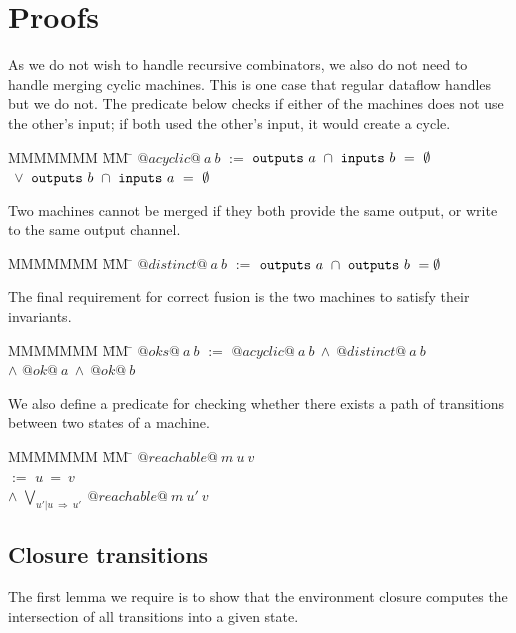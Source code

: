 \section{Proofs}
\label{s:Proofs}

As we do not wish to handle recursive combinators, we also do not need to handle merging cyclic machines.
This is one case that regular dataflow handles but we do not.
The predicate below checks if either of the machines does not use the other's input; if both used the other's input, it would create a cycle.

\begin{tabbing}
MMMMMMM \= MM \= \kill
$@acyclic@~a~b$
\> $:=$
\> $\mathtt{outputs}~a~\cap~\mathtt{inputs}~b~=~\emptyset$
\\
\> $~\vee$ \> $\mathtt{outputs}~b~\cap~\mathtt{inputs}~a~=~\emptyset$
\end{tabbing}

Two machines cannot be merged if they both provide the same output, or write to the same output channel.

\begin{tabbing}
MMMMMMM \= MM \= \kill
$@distinct@~a~b$
\> $:=$
\> $\mathtt{outputs}~a~\cap~\mathtt{outputs}~b~=\emptyset$
\end{tabbing}

The final requirement for correct fusion is the two machines to satisfy their invariants.
\begin{tabbing}
MMMMMMM \= MM \= \kill
$@oks@~a~b$
\> $:=$
\> $@acyclic@~a~b~\wedge~@distinct@~a~b$ \\
\> $\wedge$ \> $@ok@~a~\wedge~@ok@~b$ \\
\end{tabbing}

We also define a predicate for checking whether there exists a path of transitions between two states of a machine.
\begin{tabbing}
MMMMMMM \= MM \= \kill
$@reachable@~m~u~v$ \\
\> $:=$
\> $u~=~v$ \\
\> $\wedge$ \> $\bigvee_{u'|u~\Rightarrow~u'}~@reachable@~m~u'~v$ \\
\end{tabbing}

\subsection{Closure transitions}
The first lemma we require is to show that the environment closure computes the intersection of all transitions into a given state.

